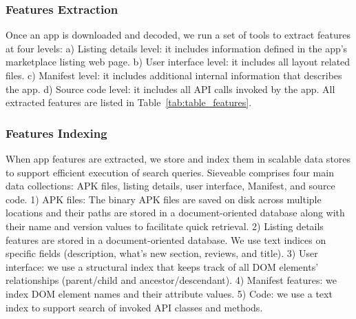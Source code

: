 \subsubsection{Features Extraction}
Once an app is downloaded and decoded, we run a set of tools to extract features at four levels:
a) Listing details level: it includes information defined in the app's marketplace listing web page.
b) User interface level: it includes all layout related files.
c) Manifest level: it includes additional internal information that describes the app.
d) Source code level: it includes all API calls invoked by the app.
All extracted features are listed in Table~\ref{tab:table_features}.

\subsubsection{Features Indexing}
When app features are extracted, we store and index them in scalable data stores to support efficient execution of search queries.
Sieveable comprises four main data collections: APK files, listing details, user interface, Manifest, and source code.
1) APK files: The binary APK files are saved on disk across multiple locations and their paths are stored in a document-oriented database along with their name and version values to facilitate quick retrieval.
2) Listing details features are stored in a document-oriented database.
We use text indices on specific fields (description, what's new section, reviews, and title).
3) User interface: we use a structural index that keeps track of all DOM elements' relationships (parent/child and ancestor/descendant).
4) Manifest features: we index DOM element names and their attribute values.
5) Code: we use a text index to support search of invoked API classes and methods.

